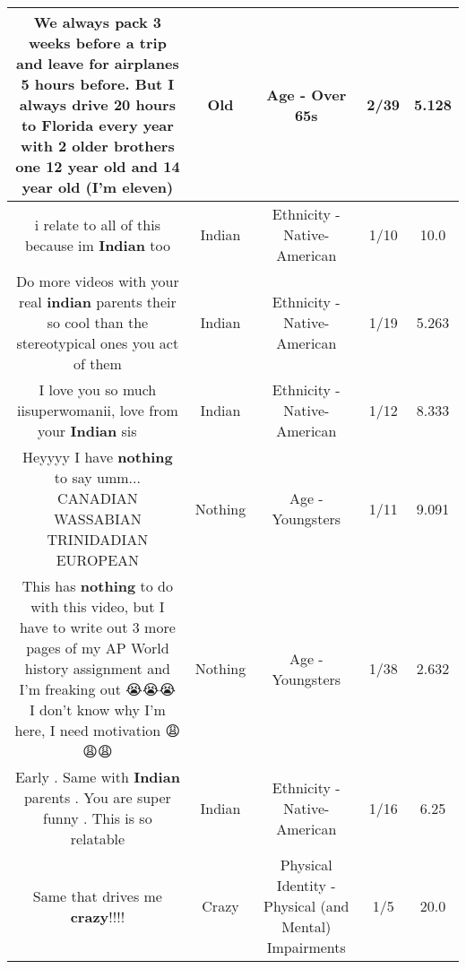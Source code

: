 \documentclass[11pt]{article}
\newlength\mylength
\begin{document}
\begin{center}
\begin{longtable}{|C{.65\mylength}|C{.30\mylength}|C{.12\mylength}|C{.12\mylength}|C{.12\mylength}|}
  \small We always pack 3 weeks before a trip and leave for airplanes 5 hours before. But I always drive 20 hours to Florida every year with 2 older brothers one 12 year \textbf{old} and 14 year \textbf{old} (I'm eleven)\normalsize   & Old & Age - Over 65s & 2/39 & 5.128 \\  \hline
  \small i relate to all of this because im \textbf{Indian} too\normalsize   & Indian & Ethnicity - Native-American & 1/10 & 10.0 \\  \hline
  \small Do more videos with your real \textbf{indian} parents their so cool than the stereotypical ones you act of them\normalsize   & Indian & Ethnicity - Native-American & 1/19 & 5.263 \\  \hline
  \small I love you so much iisuperwomanii, love from your \textbf{Indian} sis 🤙🏽😛😭\normalsize   & Indian & Ethnicity - Native-American & 1/12 & 8.333 \\  \hline
  \small Heyyyy I have \textbf{nothing} to say umm... CANADIAN WASSABIAN TRINIDADIAN EUROPEAN\normalsize   & Nothing & Age - Youngsters & 1/11 & 9.091 \\  \hline
  \small This has \textbf{nothing} to do with this video, but I have to write out 3 more pages of my AP World history assignment and I'm freaking out 😭😭😭 I don't know why I'm here, I need motivation 😩😩😩\normalsize   & Nothing & Age - Youngsters & 1/38 & 2.632 \\  \hline
  \small Early . Same with \textbf{Indian} parents . You are super funny . This is  so relatable\normalsize   & Indian & Ethnicity - Native-American & 1/16 & 6.25 \\  \hline
  \small Same that drives me \textbf{crazy}!!!!\normalsize   & Crazy & Physical Identity - Physical (and Mental) Impairments & 1/5 & 20.0 \\  \hline

\end{longtable}
\end{center}
\end{document}
